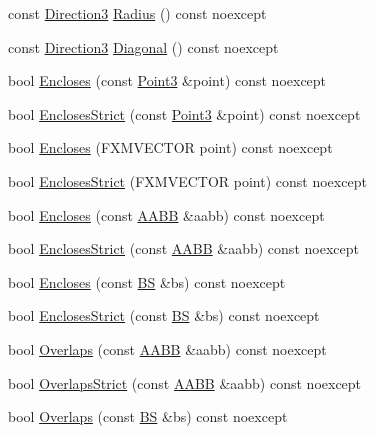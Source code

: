 \begin{DoxyCompactItemize}
\item 
const \hyperlink{structmage_1_1_direction3}{Direction3} \hyperlink{structmage_1_1_a_a_b_b_a5aa00d8ba4751f5e7b8caa2b43a2df32}{Radius} () const noexcept
\item 
const \hyperlink{structmage_1_1_direction3}{Direction3} \hyperlink{structmage_1_1_a_a_b_b_a9b9611522d1f5dd03e3c1787f8706b3d}{Diagonal} () const noexcept
\item 
bool \hyperlink{structmage_1_1_a_a_b_b_a308fce591178a9aeaed3838dfa32972f}{Encloses} (const \hyperlink{structmage_1_1_point3}{Point3} \&point) const noexcept
\item 
bool \hyperlink{structmage_1_1_a_a_b_b_a0399860c66da2dfc593b6ad5702c7525}{Encloses\+Strict} (const \hyperlink{structmage_1_1_point3}{Point3} \&point) const noexcept
\item 
bool \hyperlink{structmage_1_1_a_a_b_b_a7ad6bd87a94fca3995c3eb876f52404c}{Encloses} (F\+X\+M\+V\+E\+C\+T\+OR point) const noexcept
\item 
bool \hyperlink{structmage_1_1_a_a_b_b_a65616922dfc15d46c611764c12d50ec1}{Encloses\+Strict} (F\+X\+M\+V\+E\+C\+T\+OR point) const noexcept
\item 
bool \hyperlink{structmage_1_1_a_a_b_b_a06f017756a593461127613e4d77d0944}{Encloses} (const \hyperlink{structmage_1_1_a_a_b_b}{A\+A\+BB} \&aabb) const noexcept
\item 
bool \hyperlink{structmage_1_1_a_a_b_b_af037df0800e1e8c3564363f154c2424a}{Encloses\+Strict} (const \hyperlink{structmage_1_1_a_a_b_b}{A\+A\+BB} \&aabb) const noexcept
\item 
bool \hyperlink{structmage_1_1_a_a_b_b_ab906cfa784000d7fd49e9a405825e72f}{Encloses} (const \hyperlink{structmage_1_1_b_s}{BS} \&bs) const noexcept
\item 
bool \hyperlink{structmage_1_1_a_a_b_b_af7c0070023a2b7d3b724cd4077782fb0}{Encloses\+Strict} (const \hyperlink{structmage_1_1_b_s}{BS} \&bs) const noexcept
\item 
bool \hyperlink{structmage_1_1_a_a_b_b_a0953268725119ef25651ab50ad3de658}{Overlaps} (const \hyperlink{structmage_1_1_a_a_b_b}{A\+A\+BB} \&aabb) const noexcept
\item 
bool \hyperlink{structmage_1_1_a_a_b_b_a00628d5ed2bf73021bbb3cdf94049580}{Overlaps\+Strict} (const \hyperlink{structmage_1_1_a_a_b_b}{A\+A\+BB} \&aabb) const noexcept
\item 
bool \hyperlink{structmage_1_1_a_a_b_b_ac105ff686890e3fbb36bb230c663bde9}{Overlaps} (const \hyperlink{structmage_1_1_b_s}{BS} \&bs) const noexcept

\end{DoxyCompactItemize}

